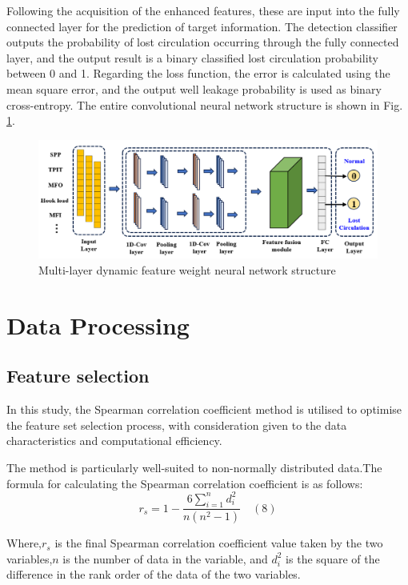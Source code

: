 \documentclass[journal,article,submit,pdftex,moreauthors]{Definitions/mdpi}
\begin{document}
Following the acquisition of the enhanced features, these are input into the fully connected layer for the prediction of target information. The detection classifier outputs the probability of lost circulation occurring through the fully connected layer, and the output result is a binary classified lost circulation probability between 0 and 1. Regarding the loss function, the error is calculated using the mean square error, and the output well leakage probability is used as binary cross-entropy. The entire convolutional neural network structure is shown in Fig. \ref{fig:Multi-layer dynamic feature weight neural network structure}.
\begin{figure}[H]
    \centering
    \includegraphics[width=0.75\linewidth]{图片/多尺度融合网络.png}
    \caption{Multi-layer dynamic feature weight neural network structure}
    \label{fig:Multi-layer dynamic feature weight neural network structure}
\end{figure}

\section{Data Processing}
\subsection{Feature selection}

In this study, the Spearman correlation coefficient method is utilised to optimise the feature set selection process, with consideration given to the data characteristics and computational efficiency.

The method is particularly well-suited to non-normally distributed data.The formula for calculating the Spearman correlation coefficient is as follows:
\[{{r}_{s}}=1-\frac{6\sum\limits_{i=1}^{n}{d_{i}^{2}}}{n\left( {{n}^{2}}-1 \right)}\quad (8)\]

Where,\({{r}_{s}}\) is the final Spearman correlation coefficient value taken by the two variables,\(n\) is the number of data in the variable, and  \(d_{i}^{2}\) is the square of the difference in the rank order of the data of the two variables.
\end{document}
